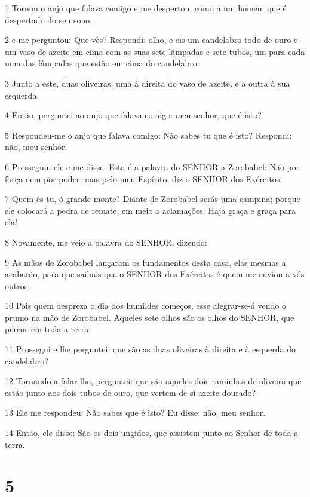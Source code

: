 \par 1 Tornou o anjo que falava comigo e me despertou, como a um homem que é despertado do seu sono,
\par 2 e me perguntou: Que vês? Respondi: olho, e eis um candelabro todo de ouro e um vaso de azeite em cima com as suas sete lâmpadas e sete tubos, um para cada uma das lâmpadas que estão em cima do candelabro.
\par 3 Junto a este, duas oliveiras, uma à direita do vaso de azeite, e a outra à sua esquerda.
\par 4 Então, perguntei ao anjo que falava comigo: meu senhor, que é isto?
\par 5 Respondeu-me o anjo que falava comigo: Não sabes tu que é isto? Respondi: não, meu senhor.
\par 6 Prosseguiu ele e me disse: Esta é a palavra do SENHOR a Zorobabel: Não por força nem por poder, mas pelo meu Espírito, diz o SENHOR dos Exércitos.
\par 7 Quem és tu, ó grande monte? Diante de Zorobabel serás uma campina; porque ele colocará a pedra de remate, em meio a aclamações: Haja graça e graça para ela!
\par 8 Novamente, me veio a palavra do SENHOR, dizendo:
\par 9 As mãos de Zorobabel lançaram os fundamentos desta casa, elas mesmas a acabarão, para que saibais que o SENHOR dos Exércitos é quem me enviou a vós outros.
\par 10 Pois quem despreza o dia dos humildes começos, esse alegrar-se-á vendo o prumo na mão de Zorobabel. Aqueles sete olhos são os olhos do SENHOR, que percorrem toda a terra.
\par 11 Prossegui e lhe perguntei: que são as duas oliveiras à direita e à esquerda do candelabro?
\par 12 Tornando a falar-lhe, perguntei: que são aqueles dois raminhos de oliveira que estão junto aos dois tubos de ouro, que vertem de si azeite dourado?
\par 13 Ele me respondeu: Não sabes que é isto? Eu disse: não, meu senhor.
\par 14 Então, ele disse: São os dois ungidos, que assistem junto ao Senhor de toda a terra.

\chapter{5}

